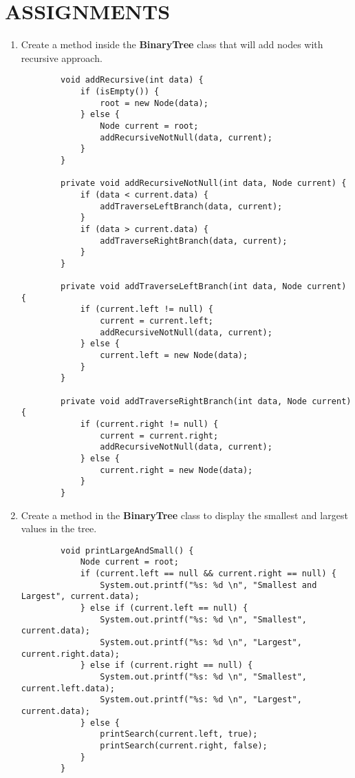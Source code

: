 \documentclass[12pt,titlepage]{article}
\begin{document}
\section{ASSIGNMENTS}
\begin{enumerate}
    \item Create a method inside the \textbf{BinaryTree} class that will add nodes with recursive approach.
    \begin{verbatim}
        void addRecursive(int data) {
            if (isEmpty()) {
                root = new Node(data);
            } else {
                Node current = root;
                addRecursiveNotNull(data, current);
            }
        }

        private void addRecursiveNotNull(int data, Node current) {
            if (data < current.data) {
                addTraverseLeftBranch(data, current);
            }
            if (data > current.data) {
                addTraverseRightBranch(data, current);
            }
        }

        private void addTraverseLeftBranch(int data, Node current) {
            if (current.left != null) {
                current = current.left;
                addRecursiveNotNull(data, current);
            } else {
                current.left = new Node(data);
            }
        }

        private void addTraverseRightBranch(int data, Node current) {
            if (current.right != null) {
                current = current.right;
                addRecursiveNotNull(data, current);
            } else {
                current.right = new Node(data);
            }
        }
    \end{verbatim}
    \item Create a method in the \textbf{BinaryTree} class to display the smallest and largest values in the tree.
    \begin{verbatim}
        void printLargeAndSmall() {
            Node current = root;
            if (current.left == null && current.right == null) {
                System.out.printf("%s: %d \n", "Smallest and Largest", current.data);
            } else if (current.left == null) {
                System.out.printf("%s: %d \n", "Smallest", current.data);
                System.out.printf("%s: %d \n", "Largest", current.right.data);
            } else if (current.right == null) {
                System.out.printf("%s: %d \n", "Smallest", current.left.data);
                System.out.printf("%s: %d \n", "Largest", current.data);
            } else {
                printSearch(current.left, true);
                printSearch(current.right, false);
            }
        }


\end{verbatim}
\end{enumerate}
\end{document}
